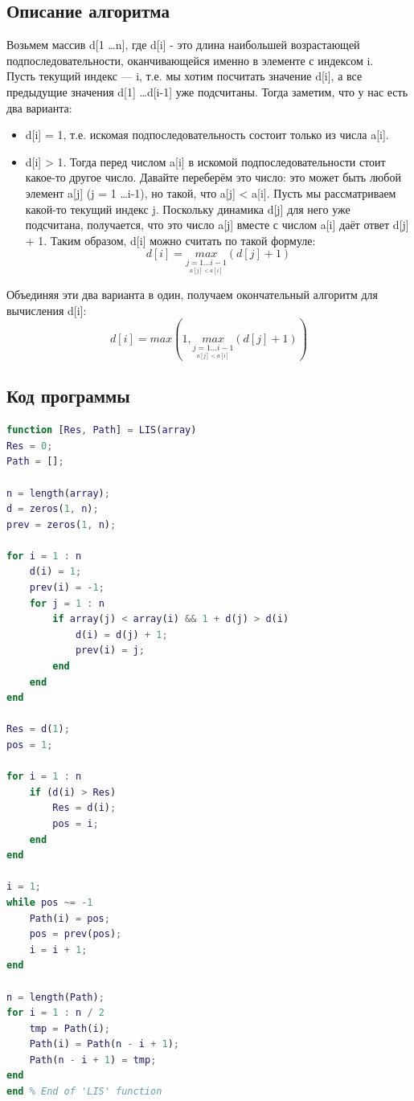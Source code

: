 \documentclass{article}
\begin{document}
\subsection{Описание алгоритма}
Возьмем массив d[1 \ldots n], где d[i] - это длина наибольшей возрастающей подпоследовательности, оканчивающейся именно в элементе с индексом i.\\
Пусть текущий индекс — i, т.е. мы хотим посчитать значение d[i], а все предыдущие значения d[1] 
\ldots d[i-1] уже подсчитаны. Тогда заметим, что у нас есть два варианта:
\begin{itemize}
	\item d[i] = 1, т.е. искомая подпоследовательность состоит только из числа a[i].
	\item  d[i] > 1. Тогда перед числом a[i] в искомой подпоследовательности стоит какое-то другое число. Давайте переберём это число: это может быть любой элемент a[j] (j = 1 \ldots i-1), но такой, что a[j] < a[i]. Пусть мы рассматриваем какой-то текущий индекс j. Поскольку динамика d[j] для него уже подсчитана, получается, что это число a[j] вместе с числом a[i] даёт ответ d[j] + 1. Таким образом, d[i] можно считать по такой формуле:
	\begin{equation}
	d[i] = \underset{\underset{a[j] < a[i]}{j = 1 \ldots i - 1}}{max} (d[j] + 1)
	\end{equation}
\end{itemize}
Объединяя эти два варианта в один, получаем окончательный алгоритм для вычисления d[i]:
	\begin{equation}
	d[i] = max(1, \underset{\underset{a[j] < a[i]}{j = 1 \ldots i - 1}}{max} (d[j] + 1))
	\end{equation}
\subsection{Код программы}
\begin{lstlisting}[language={Matlab}, caption={Наибольшая возрастающая подпоследовательность}, label={Script}]
function [Res, Path] = LIS(array)
Res = 0;
Path = [];

n = length(array);
d = zeros(1, n);
prev = zeros(1, n);

for i = 1 : n
	d(i) = 1;
	prev(i) = -1;
	for j = 1 : n
		if array(j) < array(i) && 1 + d(j) > d(i)
			d(i) = d(j) + 1;
			prev(i) = j;
		end
	end
end

Res = d(1);
pos = 1;

for i = 1 : n
	if (d(i) > Res)
		Res = d(i);
		pos = i;
	end
end

i = 1;
while pos ~= -1
	Path(i) = pos;
	pos = prev(pos);
	i = i + 1;
end

n = length(Path);
for i = 1 : n / 2
	tmp = Path(i);
	Path(i) = Path(n - i + 1);
	Path(n - i + 1) = tmp;
end
end % End of 'LIS' function
\end{lstlisting}
\end{document}
